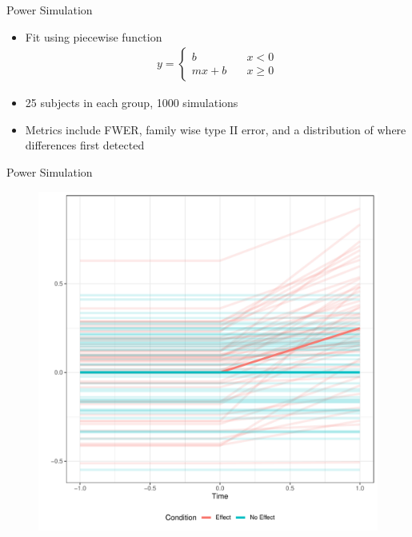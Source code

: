 \documentclass{beamer}
\begin{document}
\begin{frame}{Power Simulation}
\begin{itemize}
\item Fit using piecewise function
\begin{align*}
y = \begin{cases}
b \quad &x < 0 \\
mx + b \quad &x \geq 0
\end{cases}
\end{align*}
\item 25 subjects in each group, 1000 simulations
\item Metrics include FWER, family wise type II error, and a distribution of where differences first detected 
\end{itemize}
\end{frame}

\begin{frame}{Power Simulation}
\begin{figure}
\centering
\includegraphics[scale = 0.4]{piecewise_distribution.pdf}
\end{figure}
\end{frame}
\end{document}
